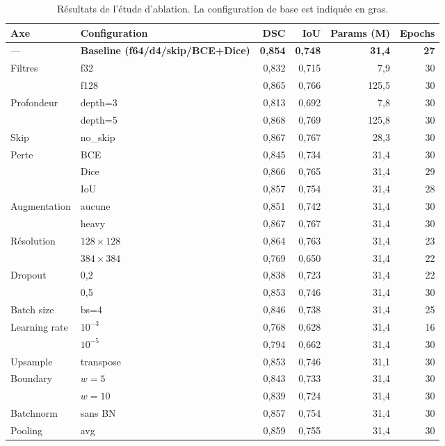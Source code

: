 \documentclass[12pt,a4paper]{article}
\begin{document}
\begin{table}[H]
\centering
\caption{Résultats de l'étude d'ablation. La configuration de base est indiquée en gras.}
\label{tab:ablation}
\small
\begin{tabular}{l l r r r r}
\toprule
\textbf{Axe} & \textbf{Configuration} & \textbf{DSC} & \textbf{IoU} & \textbf{Params (M)} & \textbf{Epochs} \\
\midrule
--- & \textbf{Baseline (f64/d4/skip/BCE+Dice)} & \textbf{0,854} & \textbf{0,748} & \textbf{31,4} & \textbf{27} \\
\midrule
\multirow{2}{*}{Filtres} & f32 & 0,832 & 0,715 & 7,9 & 30 \\
 & f128 & 0,865 & 0,766 & 125,5 & 30 \\
\midrule
\multirow{2}{*}{Profondeur} & depth=3 & 0,813 & 0,692 & 7,8 & 30 \\
 & depth=5 & 0,868 & 0,769 & 125,8 & 30 \\
\midrule
Skip & no\_skip & 0,867 & 0,767 & 28,3 & 30 \\
\midrule
\multirow{3}{*}{Perte} & BCE & 0,845 & 0,734 & 31,4 & 30 \\
 & Dice & 0,866 & 0,765 & 31,4 & 29 \\
 & IoU & 0,857 & 0,754 & 31,4 & 28 \\
\midrule
\multirow{2}{*}{Augmentation} & aucune & 0,851 & 0,742 & 31,4 & 30 \\
 & heavy & 0,867 & 0,767 & 31,4 & 30 \\
\midrule
\multirow{2}{*}{Résolution} & $128 \times 128$ & 0,864 & 0,763 & 31,4 & 23 \\
 & $384 \times 384$ & 0,769 & 0,650 & 31,4 & 22 \\
\midrule
\multirow{2}{*}{Dropout} & 0,2 & 0,838 & 0,723 & 31,4 & 22 \\
 & 0,5 & 0,853 & 0,746 & 31,4 & 30 \\
\midrule
Batch size & bs=4 & 0,846 & 0,738 & 31,4 & 25 \\
\midrule
\multirow{2}{*}{Learning rate} & $10^{-3}$ & 0,768 & 0,628 & 31,4 & 16 \\
 & $10^{-5}$ & 0,794 & 0,662 & 31,4 & 30 \\
\midrule
Upsample & transpose & 0,853 & 0,746 & 31,1 & 30 \\
\midrule
\multirow{2}{*}{Boundary} & $w=5$ & 0,843 & 0,733 & 31,4 & 30 \\
 & $w=10$ & 0,839 & 0,724 & 31,4 & 30 \\
\midrule
Batchnorm & sans BN & 0,857 & 0,754 & 31,4 & 30 \\
\midrule
Pooling & avg & 0,859 & 0,755 & 31,4 & 30 \\
\bottomrule
\end{tabular}
\end{table}
\end{document}
